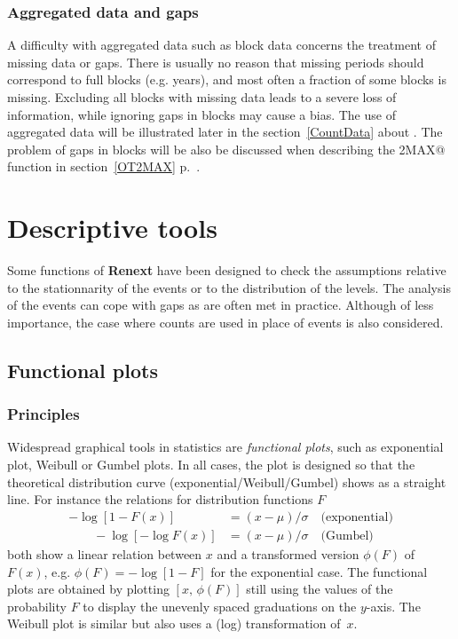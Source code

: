 \documentclass[a4paper]{report}
\newcommand{\pkg}[1]{\textbf{#1}}
\begin{document}
\subsection{Aggregated  data and gaps} 
A difficulty with aggregated data such as block data concerns the
treatment of missing data or gaps. There is usually no reason that
missing periods should correspond to full blocks (e.g. years), and
most often a fraction of some blocks is missing. Excluding all blocks
with missing data leads to a severe loss of information, while
ignoring gaps in blocks may cause a bias.  The use of aggregated data
will be illustrated later in the section~\ref{CountData}
about \verb@barplotRenouv@. The problem of gaps in blocks will be also be
discussed when describing the \verb@OT2MAX@ function in
section~\ref{OT2MAX} p.~\pageref{OT2MAX}.
  

\chapter{Descriptive  tools}
\label{Chap-DescriptiveTools}

Some functions of \pkg{Renext} have been designed to check the
assumptions relative to the stationnarity of the events or to the
distribution of the levels.  The analysis of the events can cope with
gaps as are often met in practice. Although of less importance, the
case where counts are used in place of events is also considered.

\section{Functional plots}
\subsection{Principles}
\label{FUNCPLOTS}
%
Widespread graphical tools in statistics are \textit{functional
  plots}, such as exponential plot, Weibull or Gumbel plots. In all
cases, the plot is designed so that the theoretical distribution curve
(exponential/Weibull/Gumbel) shows as a straight line. For instance
the relations for distribution functions $F$
\begin{align*}
  -\log\left[1-F(x) \right] &= (x-\mu)/\sigma     \quad \textrm{(exponential)}\\
  \qquad
  -\log\left[-\log F(x) \right] &= (x-\mu)/\sigma \quad \textrm{(Gumbel)}
\end{align*}
both show a linear relation between $x$ and a transformed version
$\phi(F)$ of~$F(x)$, e.g. $\phi(F)= -\log\left[1-F \right]$ for the
exponential case.  The functional plots are obtained by plotting
$[x,\,\phi(F)]$ still using the values of the probability $F$ to
display the unevenly spaced graduations on the $y$-axis. The Weibull
plot is similar but also uses a (log) transformation of~$x$.
\end{document}
